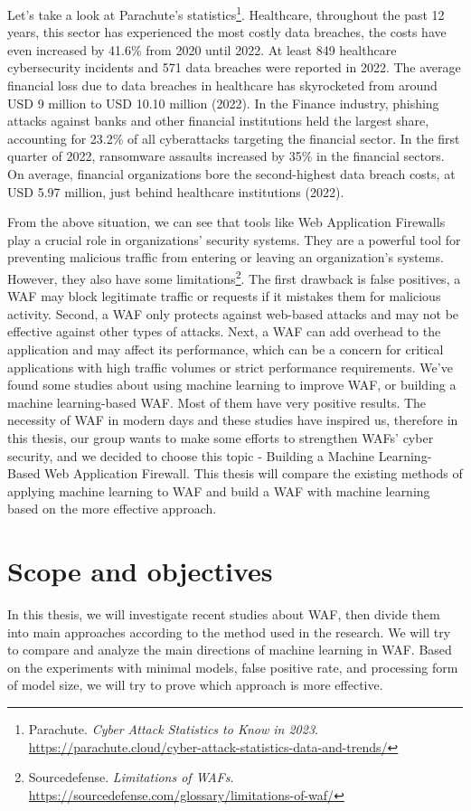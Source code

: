 Let's take a look at Parachute's statistics\footnote{Parachute. 
\textit{Cyber Attack Statistics to Know in 2023}. \url{https://parachute.cloud/cyber-attack-statistics-data-and-trends/}}. 
Healthcare, throughout the past 12 years, this sector has experienced the most costly data breaches, the costs have even increased by 41.6\% from 2020 until 2022. At least 849 healthcare cybersecurity incidents and 571 data breaches were reported in 2022. The average financial loss due to data breaches in healthcare has skyrocketed from around USD 9 million to USD 10.10 million (2022). In the Finance industry, phishing attacks against banks and other financial institutions held the largest share, accounting for 23.2\% of all cyberattacks targeting the financial sector. In the first quarter of 2022, ransomware assaults increased by 35\% in the financial sectors. On average, financial organizations bore the second-highest data breach costs, at USD 5.97 million, just behind healthcare institutions (2022). 

From the above situation, we can see that tools like Web Application Firewalls play a crucial role in organizations' security systems. They are a powerful tool for preventing malicious traffic from entering or leaving an organization's systems. However, they also have some limitations\footnote{Sourcedefense. \textit{Limitations of WAFs}. \url{https://sourcedefense.com/glossary/limitations-of-waf/}}. The first drawback is false positives, a WAF may block legitimate traffic or requests if it mistakes them for malicious activity. Second, a WAF only protects against web-based attacks and may not be effective against other types of attacks. Next, a WAF can add overhead to the application and may affect its performance, which can be a concern for critical applications with high traffic volumes or strict performance requirements. We've found some studies about using machine learning to improve WAF, or building a machine learning-based WAF. Most of them have very positive results. The necessity of WAF in modern days and these studies have inspired us, therefore in this thesis, our group wants to make some efforts to strengthen WAFs' cyber security, and we decided to choose this topic - Building a Machine Learning-Based Web Application Firewall. This thesis will compare the existing methods of applying machine learning to WAF and build a WAF with machine learning based on the more effective approach.
\newpage
\section{Scope and objectives}
\label{sec:objectives}
\hspace{0.5cm}In this thesis, we will investigate recent studies about WAF, then divide them into main approaches according to the method used in the research. We will try to compare and analyze the main directions of machine learning in WAF. Based on the experiments with minimal models, false positive rate, and processing form of model size, we will try to prove which approach is more effective.

